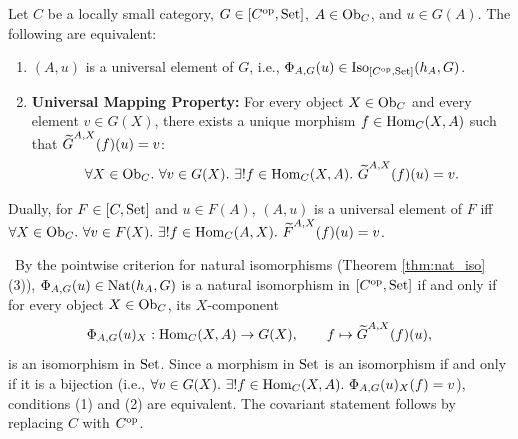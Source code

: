 \documentclass[10pt,a4paper]{article}
\begin{document}
\begin{theorem}\label{thm:univ_elem_char}
Let $C$ be a locally small category, $G \in [C^{\textrm{op}}, {\textrm{Set}}]$, $A \in {\textrm{Ob}}_C$, and $u \in G(A)$. The following are equivalent:
\begin{enumerate}
\item $(A, u)$ is a universal element of $G$, i.e., $\Phi_{A,G}(u) \in \mathrm{Iso}_{[C^{\textrm{op}},{\textrm{Set}}]}(h_A, G)$.
\item \textbf{Universal Mapping Property:} For every object $X \in {\textrm{Ob}}_C$ and every element $v \in G(X)$, there exists a unique morphism $f \in {\textrm{Hom}}_C(X, A)$ such that ${\widetilde{G}\textrm{}}^{A,X}(f)(u) = v$:
$$\forall X \in \Ob_C.\ \forall v \in G(X).\ \exists !f \in \Hom_C(X, A).\ \GMor^{A,X}(f)(u) = v.$$
\end{enumerate}
Dually, for $F \in [C, {\textrm{Set}}]$ and $u \in F(A)$, $(A, u)$ is a universal element of $F$ iff $\forall X \in {\textrm{Ob}}_C.\ \forall v \in F(X).\ \exists !f \in {\textrm{Hom}}_C(A, X).\ {\widetilde{F}\textrm{}}^{A,X}(f)(u) = v$.
\end{theorem}
\myprf\ By the pointwise criterion for natural isomorphisms (Theorem \ref{thm:nat_iso}(3)), $\Phi_{A,G}(u) \in {\textrm{Nat}}(h_A, G)$ is a natural isomorphism in $[C^{\textrm{op}}, {\textrm{Set}}]$ if and only if for every object $X \in {\textrm{Ob}}_C$, its $X$-component
$$\Phi_{A,G}(u)_X : {\textrm{Hom}}_C(X, A) \to G(X), \qquad f \mapsto {\widetilde{G}\textrm{}}^{A,X}(f)(u),$$
is an isomorphism in ${\textrm{Set}}$. Since a morphism in ${\textrm{Set}}$ is an isomorphism if and only if it is a bijection (i.e., $\forall v \in G(X).\ \exists !f \in \Hom_C(X,A).\ \Phi_{A,G}(u)_X(f) = v$), conditions (1) and (2) are equivalent. The covariant statement follows by replacing $C$ with $C^{\textrm{op}}$. \myqed
\end{document}

